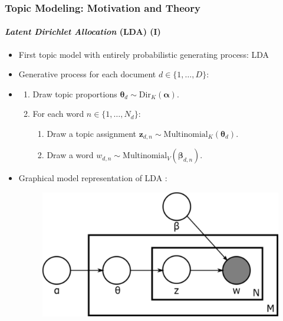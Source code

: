 \documentclass[xcolor=dvipsnames]{beamer}
\begin{document}
\begin{frame}
\frametitle{Topic Modeling: Motivation and Theory}
\framesubtitle{\textit{Latent Dirichlet Allocation} (LDA) (I)}
\begin{itemize}
\item First topic model with entirely probabilistic generating process: LDA \parencite{blei2003latent}
\item Generative process for each document $d \in \{1,\dots,D\}$:
\item[] 
	\begin{enumerate}[{1)}]
	\item Draw topic proportions $\boldsymbol{\theta}_d \sim \text{Dir}_K(\boldsymbol{\alpha})$.
	\item For each word $n \in \{1,\dots,N_d\}$:
		\begin{enumerate}[{a)}]
		\item Draw a topic assignment $\boldsymbol{z}_{d,n} \sim \text{Multinomial}_K(\boldsymbol{\theta}_d)$.
		\item Draw a word $w_{d,n} \sim \text{Multinomial}_V(\boldsymbol{\beta}_{d,n})$.
	\end{enumerate}
\end{enumerate}
\item Graphical model representation of LDA \parencite{blei2003latent}:
	\begin{figure}[h!]
  	\centering
  	\hspace*{-1cm}\includegraphics[scale = 0.3]{../plots/presentation/lda_graphical.pdf}
	\end{figure}
\end{itemize}
\end{frame}
\end{document}
